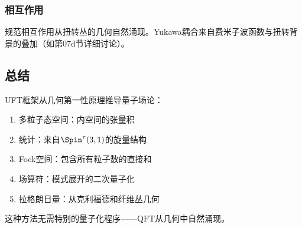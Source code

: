 \subsubsection{相互作用}

规范相互作用从扭转丛的几何自然涌现。Yukawa耦合来自费米子波函数与扭转背景的叠加（如第07d节详细讨论）。

\subsection{总结}

UFT框架从几何第一性原理推导量子场论：
\begin{enumerate}
    \item 多粒子态空间：内空间的张量积
    \item 统计：来自$\Spin^\tau(3,1)$的旋量结构
    \item Fock空间：包含所有粒子数的直接和
    \item 场算符：模式展开的二次量子化
    \item 拉格朗日量：从克利福德和纤维丛几何
\end{enumerate}

这种方法无需特别的量子化程序——QFT从几何中自然涌现。
